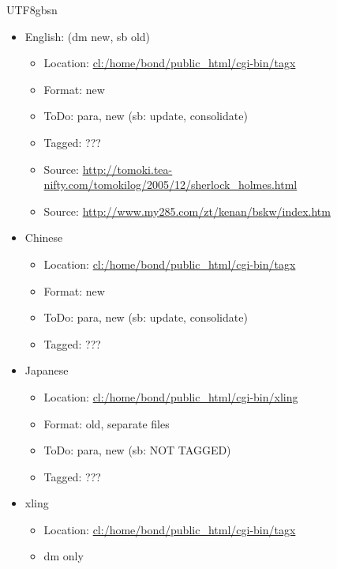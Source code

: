 \documentclass[12pt]{book} %
\begin{document}
\begin{CJK}{UTF8}{gbsn}
\begin{itemize}
\item English: (dm new, sb old)
  \begin{itemize}
  \item Location: \url{cl:/home/bond/public_html/cgi-bin/tagx}
  \item Format: new
  \item ToDo:  para, new (sb: update, consolidate)
  \item Tagged: ???
  \item Source: \url{http://tomoki.tea-nifty.com/tomokilog/2005/12/sherlock_holmes.html}
  \item Source: \url{http://www.my285.com/zt/kenan/bskw/index.htm}
  \end{itemize}
\item Chinese
  \begin{itemize}
  \item Location: \url{cl:/home/bond/public_html/cgi-bin/tagx}
  \item Format: new
  \item ToDo:  para, new (sb: update, consolidate)
  \item Tagged: ???
  \end{itemize}
\item Japanese
  \begin{itemize}
  \item Location: \url{cl:/home/bond/public_html/cgi-bin/xling}
  \item Format: old, separate files
  \item ToDo:  para, new (sb: NOT TAGGED)
  \item Tagged: ???
  \end{itemize}
\item xling
  \begin{itemize}
  \item Location: \url{cl:/home/bond/public_html/cgi-bin/tagx}
  \item dm only
  \end{itemize}
\end{itemize}


\end{CJK}
\end{document}
